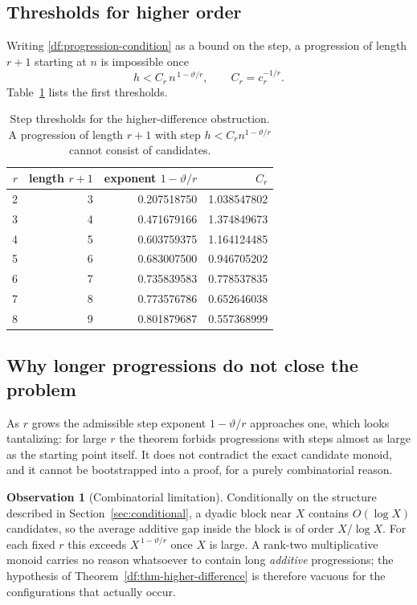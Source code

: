 \documentclass[11pt,oneside]{article}
\theoremstyle{definition}
\newtheorem{observation}[theorem]{Observation}
\theoremstyle{remark}
\newcommand{\thetaq}{\vartheta}
\begin{document}
\subsection{Thresholds for higher order}

Writing \eqref{df:progression-condition} as a bound on the step, a progression of length
$r+1$ starting at $n$ is impossible once
\[
 h<C_r\,n^{\,1-\thetaq/r},
 \qquad C_r=c_r^{-1/r}.
\]
Table~\ref{df:tab-difference-thresholds} lists the first thresholds.

\begin{table}[ht]
\centering
\small
\begin{tabular}{@{}rrrr@{}}
\toprule
$r$ & length $r+1$ & exponent $1-\thetaq/r$ & $C_r$ \\
\midrule
2 & 3 & 0.207518750 & 1.038547802 \\
3 & 4 & 0.471679166 & 1.374849673 \\
4 & 5 & 0.603759375 & 1.164124485 \\
5 & 6 & 0.683007500 & 0.946705202 \\
6 & 7 & 0.735839583 & 0.778537835 \\
7 & 8 & 0.773576786 & 0.652646038 \\
8 & 9 & 0.801879687 & 0.557368999 \\
\bottomrule
\end{tabular}
\caption{Step thresholds for the higher-difference obstruction.  A progression of length
$r+1$ with step $h<C_rn^{1-\thetaq/r}$ cannot consist of candidates.}
\label{df:tab-difference-thresholds}
\end{table}

\subsection{Why longer progressions do not close the problem}

As $r$ grows the admissible step exponent $1-\thetaq/r$ approaches one, which looks
tantalizing: for large $r$ the theorem forbids progressions with steps almost as large as the
starting point itself.  It does not contradict the exact candidate monoid, and it cannot be
bootstrapped into a proof, for a purely combinatorial reason.

\begin{observation}[Combinatorial limitation]
\label{df:obs-combinatorial}
Conditionally on the structure described in Section~\ref{sec:conditional}, a dyadic block near
$X$ contains $O(\log X)$ candidates, so the average additive gap inside the block is of order
$X/\log X$.  For each fixed $r$ this exceeds $X^{\,1-\thetaq/r}$ once $X$ is large.  A
rank-two multiplicative monoid carries no reason whatsoever to contain long \emph{additive}
progressions; the hypothesis of Theorem~\ref{df:thm-higher-difference} is therefore vacuous
for the configurations that actually occur.
\end{observation}
\end{document}

